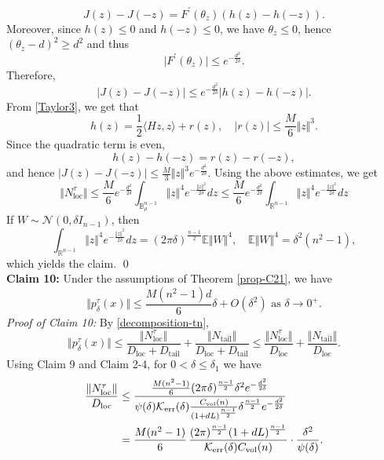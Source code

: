 \documentclass[11pt]{amsart}
\newcommand{\1}{\mathds{1}}
\theoremstyle{definition}
\theoremstyle{remark}
\theoremstyle{definition}
\begin{document}
$$
J(z)-J(-z)=F^{\prime}(\theta_z)(h(z)-h(-z)).
$$
Moreover, since $h(z)\leq 0$ and $h(-z)\leq 0$, we have $\theta_z\leq 0$, hence $(\theta_z-d)^2\geq d^2$ and thus
$$
\vert F^{\prime}(\theta_z)\vert \leq e^{-\frac{d^2}{2\delta}}.
$$
Therefore,
$$
\vert J(z)-J(-z)\vert\leq e^{-\frac{d^2}{2\delta}} \vert h(z)-h(-z)\vert.
$$
From \eqref{Taylor3}, we get that
$$
h(z)=\frac{1}{2}\langle Hz,z\rangle +r(z), \quad \vert r(z)\vert \leq \frac{M}{6}\Vert z\Vert^3.
$$
Since the quadratic term is even, 
$$
h(z)-h(-z)=r(z)-r(-z),
$$
and hence $\vert J(z)-J(-z)\vert \leq \frac{M}{3}\Vert z\Vert^3 e^{-\frac{d^2}{2\delta}}$. Using the above estimates, we get
$$
\Vert N_{\operatorname{loc}}^{\tau}\Vert \leq \frac{M}{6}e^{-\frac{d^2}{2\delta}}\int_{\mathbb{B}_{\rho}^{n-1}} \Vert z\Vert^4 e^{-\frac{\Vert z\Vert^2}{2\delta}}dz\leq  \frac{M}{6}e^{-\frac{d^2}{2\delta}}\int_{\mathbb{R}^{n-1}} \Vert z\Vert^4 e^{-\frac{\Vert z\Vert^2}{2\delta}}dz
$$
If $W\sim \mathcal{N}(0,\delta I_{n-1})$, then
$$
\int_{\mathbb{R}^{n-1}} \Vert z\Vert^4 e^{-\frac{\Vert z\Vert^2}{2\delta}}dz=(2\pi \delta)^{\frac{n-1}{2}} \mathbb{E}\Vert W\Vert^4, \quad \mathbb{E}\Vert W\Vert^4= \delta^2 (n^2-1),
$$
which yields the claim. \qed\\
\noindent\textbf{Claim 10:} Under the assumptions of Theorem \ref{prop-C21}, we have
$$
\Vert p_{\delta}^{\tau}(x)\Vert \leq \frac{M(n^2-1)d}{6}\delta +O(\delta^2) \textrm{ as } \delta \to 0^{+}.
$$
\emph{Proof of Claim 10:}  By \eqref{decomposition-tn}, 
$$
\Vert p_{\delta}^{\tau}(x)\Vert \leq \frac{\Vert N_{\operatorname{loc}}^{\tau}\Vert }{D_{\operatorname{loc}}+D_{\operatorname{tail}}}+\frac{\Vert N_{\operatorname{tail}}\Vert }{D_{\operatorname{loc}}+D_{\operatorname{tail}}}\leq \frac{\Vert N_{\operatorname{loc}}^{\tau}\Vert }{D_{\operatorname{loc}}}+\frac{\Vert N_{\operatorname{tail}}\Vert }{D_{\operatorname{loc}}}.
$$
Using Claim 9 and Claim 2-4, for $0<\delta \leq \delta_1$ we have
\begin{equation*}
    \begin{aligned}
        \frac{\Vert N_{\operatorname{loc}}^{\tau}\Vert }{D_{\operatorname{loc}}}&\leq \frac{\frac{M(n^2-1)}{6}(2\pi\delta)^{\frac{n-1}{2}}\delta^2 e^{-\frac{d^2}{2\delta}}}
{\psi(\delta)\mathcal K_{\rm err}(\delta)\frac{C_{\rm vol}(n)}{(1+dL)^{\frac{n-1}{2}}}\delta^{\frac{n-1}{2}}e^{-\frac{d^2}{2\delta}}}\\
&=
\frac{M(n^2-1)}{6}\,
\frac{(2\pi)^{\frac{n-1}{2}}(1+dL)^{\frac{n-1}{2}}}{\mathcal K_{\rm err}(\delta)C_{\rm vol}(n)}
\cdot \frac{\delta^2}{\psi(\delta)}.
    \end{aligned}
\end{equation*}
\end{document}
